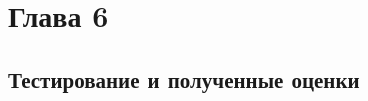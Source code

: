 \documentclass[14pt, a4paper]{extreport}
\begin{document}





\newpage

\chapter{Глава 6}

\section{Тестирование и полученные оценки}
\end{document}
